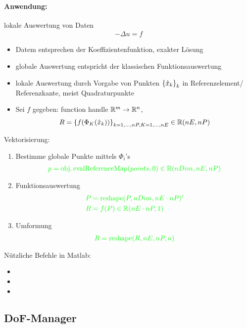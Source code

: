 \paragraph{Anwendung:} lokale Auswertung von Daten 
\begin{align*}
  - \Delta u = f
\end{align*}
\begin{itemize}
\item Datem entsprechen der Koeffizientenfunktion, exakter Lösung
\item globale Auswertung entspricht der klassischen Funktionsauswertung
\item lokale Auswertung durch Vorgabe von Punkten $\left\{ \hat x_k \right\}_k$ in Referenzelement/ Referenzkante, meist Quadraturpunkte
\item Sei $f$ gegeben: function handle $\mathbb{R}^m \to \mathbb{R}^n$, 
  \begin{align*}
    R = \left\{ f(\Phi_K(\hat x_k)) \right\}_{k = 1, \dots, nP, K = 1, \dots, nE} \in \mathbb{R}(nE, nP)
  \end{align*}
\end{itemize}
Vektorisierung:
\begin{enumerate}
\item Bestimme globale Punkte mittels $\Phi_i$'s
  \begin{align*}
    {\color{green} p = \operatorname{obj.evalReferenceMap}(points, 0) \in \mathbb{R}(nDim, nE, nP)}
  \end{align*} 
\item Funktionsauswertung
  \begin{align*}
 &   {\color{green} P = \operatorname{reshape}(P, nDim, nE \cdot nP)'}\\
&{\color{green} R = f(P) \in \mathbb{R}(nE \cdot nP, 1)}
  \end{align*}
\item Umformung
  \begin{align*}
    {\color{green} R = \operatorname{reshape}(R, nE, nP, n)}
  \end{align*} 
\end{enumerate}

Nützliche Befehle in Matlab:
\begin{itemize}
\item {}
\item {}
\item {}
\end{itemize}

\subsection{DoF-Manager}

